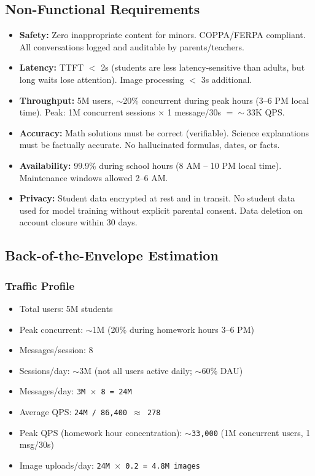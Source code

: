 \subsection*{Non-Functional Requirements}

\begin{itemize}
  \item \textbf{Safety:} Zero inappropriate content for minors. COPPA/FERPA compliant. All conversations logged and auditable by parents/teachers.
  \item \textbf{Latency:} TTFT $<$ 2s (students are less latency-sensitive than adults, but long waits lose attention). Image processing $<$ 3s additional.
  \item \textbf{Throughput:} 5M users, $\sim$20\% concurrent during peak hours (3--6 PM local time). Peak: 1M concurrent sessions $\times$ 1 message/30s $= \sim$33K QPS.
  \item \textbf{Accuracy:} Math solutions must be correct (verifiable). Science explanations must be factually accurate. No hallucinated formulas, dates, or facts.
  \item \textbf{Availability:} 99.9\% during school hours (8 AM -- 10 PM local time). Maintenance windows allowed 2--6 AM.
  \item \textbf{Privacy:} Student data encrypted at rest and in transit. No student data used for model training without explicit parental consent. Data deletion on account closure within 30 days.
\end{itemize}

\subsection*{Back-of-the-Envelope Estimation}

\subsubsection*{Traffic Profile}

\begin{itemize}
  \item Total users: 5M students
  \item Peak concurrent: $\sim$1M (20\% during homework hours 3--6 PM)
  \item Messages/session: 8
  \item Sessions/day: $\sim$3M (not all users active daily; $\sim$60\% DAU)
  \item Messages/day: \texttt{3M $\times$ 8 = 24M}
  \item Average QPS: \texttt{24M / 86,400 $\approx$ 278}
  \item Peak QPS (homework hour concentration): \texttt{$\sim$33,000} (1M concurrent users, 1 msg/30s)
  \item Image uploads/day: \texttt{24M $\times$ 0.2 = 4.8M images}
\end{itemize}

